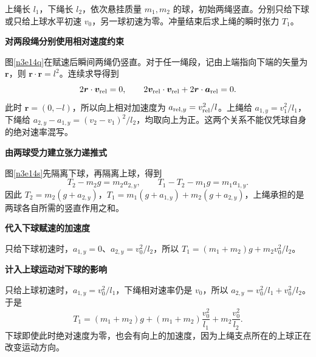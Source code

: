 \begin{question}\begin{example}[给上球或下球水平初速]\label{n3e14}
上绳长 $l_1$，下绳长 $l_2$，依次悬挂质量 $m_1,m_2$ 的球，初始两绳竖直。分别只给下球或只给上球水平初速 $v_0$，另一球初速为零。冲量结束后求上绳的瞬时张力 $T_1$。
\end{example}\end{question}
\begin{solution}\textbf{对两段绳分别使用相对速度约束}\par\nobreak
图\ref{n3e14q}在赋速后瞬间两绳仍竖直。对于任一绳段，记由上端指向下端的矢量为 $\bm r$，则 $\bm r\cdot\bm r=l^2$。连续求导得到
\[
2\bm r\cdot\bm v_{\rm rel}=0,\qquad
2\bm v_{\rm rel}\cdot\bm v_{\rm rel}
+2\bm r\cdot\bm a_{\rm rel}=0.
\]
此时 $\bm r=(0,-l)$，所以向上相对加速度为 $a_{{\rm rel},y}=v_{\rm rel}^2/l$。上绳给 $a_{1,y}=v_1^2/l_1$，下绳给 $a_{2,y}-a_{1,y}=(v_2-v_1)^2/l_2$，均取向上为正。这两个关系不能仅凭球自身的绝对速率混写。


\par\medskip{}\noindent\textbf{由两球受力建立张力递推式}\par\nobreak
图\ref{n3e14s}先隔离下球，再隔离上球，得到
\[
T_2-m_2g=m_2a_{2,y},\qquad T_1-T_2-m_1g=m_1a_{1,y}.
\]
因此 $T_2=m_2(g+a_{2,y})$，$T_1=m_1(g+a_{1,y})+m_2(g+a_{2,y})$，上绳承担的是两球各自所需的竖直作用之和。

\par\medskip{}\noindent\textbf{代入下球赋速的加速度}\par\nobreak
只给下球初速时，$a_{1,y}=0$、$a_{2,y}=v_0^2/l_2$，所以 $T_1=(m_1+m_2)g+m_2v_0^2/l_2$。



\par\medskip{}\noindent\textbf{计入上球运动对下球的影响}\par\nobreak
只给上球初速时，$a_{1,y}=v_0^2/l_1$，下绳相对速率仍是 $v_0$，所以 $a_{2,y}=v_0^2/l_1+v_0^2/l_2$。于是
\[T_1=(m_1+m_2)g+(m_1+m_2)\frac{v_0^2}{l_1}+m_2\frac{v_0^2}{l_2}.\]
下球即使此时绝对速度为零，也会有向上的加速度，因为上绳支点所在的上球正在改变运动方向。
\end{solution}

